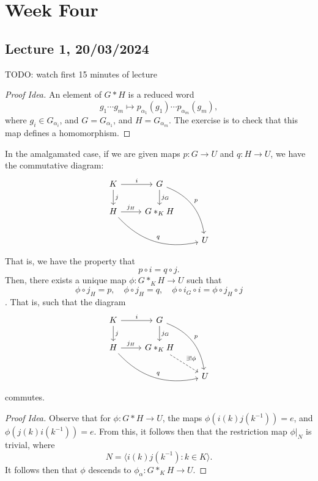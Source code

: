 \documentclass[a4paper]{report}
\theoremstyle{definition}
\theoremstyle{remark}
\theoremstyle{proposition}
\theoremstyle{conjecture}
\theoremstyle{lemma}
\theoremstyle{corollary}
\theoremstyle{exercise}
\begin{document}
\chapter{Week Four}

\section{Lecture 1, 20/03/2024}

TODO: watch first 15 minutes of lecture

\begin{proof}[Proof Idea]
    An element of $G \ast H$ is a reduced word 
    $$g_1\cdots g_m \longmapsto p_{\alpha_1} (g_1) \cdots p_{\alpha_m}(g_m),$$
    where $g_i \in G_{\alpha_i}$, and $G = G_{\alpha_1}$, and 
    $H = G_{\alpha_m}$. The exercise is to check that this map 
    defines a homomorphism.
\end{proof}

In the amalgamated case, if we are given maps 
$p : G \to U$ and $q : H \to U$, we have the commutative diagram:
$$\begin{tikzcd}
    K \arrow[r, "i"] \arrow[d, "j"]                 & G \arrow[d, "j_G"] \arrow[rdd, "p", bend left] &   \\
    H \arrow[r, "j_H"] \arrow[rrd, "q", bend right] & G \ast_K H                                     &   \\
                                                    &                                                & U
\end{tikzcd}$$
That is, we have the property that $$p\circ i = q \circ j.$$
Then, there exists a unique map $\phi : G \ast_K H \to U$
such that $$\phi \circ j_H = p, \quad \phi \circ j_H = q,\quad \phi \circ i_G \circ i = \phi \circ j_H \circ j$$.
That is, such that the diagram $$\begin{tikzcd}
    K \arrow[r, "i"] \arrow[d, "j"]                 & G \arrow[d, "j_G"] \arrow[rdd, "p", bend left] &   \\
    H \arrow[r, "j_H"] \arrow[rrd, "q", bend right] & G \ast_K H \arrow[rd, "\exists!\phi", dashed]  &   \\
                                                    &                                                & U
\end{tikzcd}$$ commutes.

\begin{proof}[Proof Idea]
    Observe that for $\phi : G \ast H \to U$, the maps
    $\phi(i(k)j(k^{-1})) = e$, and $\phi(j(k) i(k^{-1})) = e$. 
    From this, it follows then that the restriction map $\phi\vert_N$ is 
    trivial, where $$N = \langle i(k)j(k^{-1}) : k \in K \rangle.$$
    It follows then that $\phi$ descends to $\phi_\alpha : G \ast_K H \to U$.
\end{proof}
\end{document}
